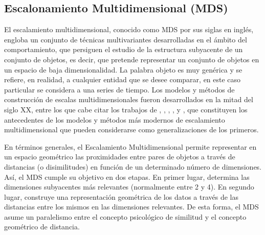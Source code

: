 \documentclass[12pt,oneside]{book}\usepackage[]{graphicx}\usepackage[]{color}
\theoremstyle{definition} %
\begin{document}

\subsection{Escalonamiento Multidimensional (MDS)}


El escalamiento multidimensional, conocido como MDS por sus siglas en inglés, engloba un conjunto de técnicas multivariantes desarrolladas en el ámbito del comportamiento, que persiguen el estudio de la estructura subyacente de un conjunto de objetos, es decir, que pretende representar un conjunto de objetos en un espacio de baja dimensionalidad. La palabra objeto es muy genérica y se refiere, en realidad, a cualquier entidad que se desee comparar, en este caso particular se considera a una series de tiempo. Los modelos y métodos de construcción de escalas multidimensionales fueron desarrollados en la mitad del siglo XX, entre los que cabe citar los trabajos de \citeauthor{stevens1946theory} \citeyear{stevens1946theory}, \citeauthor{coombs1950psychological} \citeyear{coombs1950psychological}, \citeauthor{torgerson1958theory} \citeyear{torgerson1958theory}, \citeauthor{kruskal1964multidimensional} \citeyear{kruskal1964multidimensional}, y \citeauthor{guttman1968general} \citeyear{guttman1968general}, que constituyen los antecedentes de los modelos y métodos más modernos de escalamiento multidimensional que pueden considerarse como generalizaciones de los primeros.




En términos generales, el Escalamiento Multidimensional permite representar en un espacio geométrico las proximidades entre pares de objetos a través de distancias (o disimilitudes) en función de un determinado número de dimensiones. Así, el MDS cumple su objetivo en dos etapas. En primer lugar, determina las dimensiones subyacentes más relevantes (normalmente entre 2 y 4). En segundo lugar, construye una representación geométrica de los datos a través de las distancias entre los mismos en las dimensiones relevantes.  De esta forma, el MDS asume un paralelismo entre el concepto psicológico de similitud y el concepto geométrico de distancia.


\end{document}
